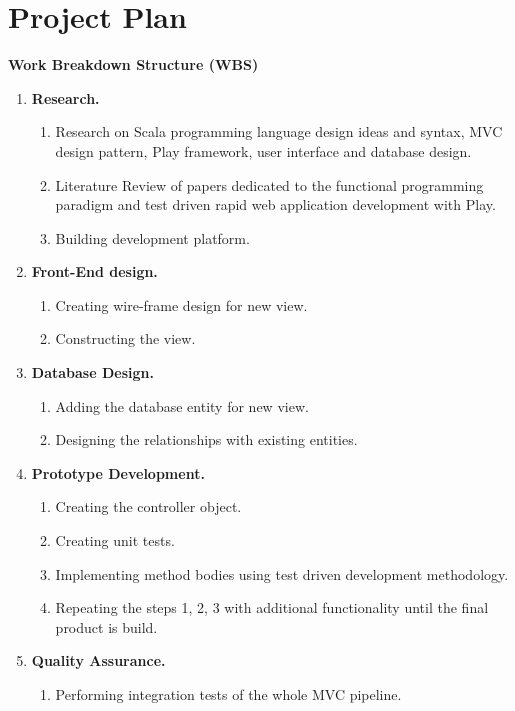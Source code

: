 \documentclass[12pt,twoside,a4paper]{report}
\begin{document}
\section{Project Plan}\label{1.7}
\textbf{Work Breakdown Structure (WBS)}
\begin{enumerate}
\item \textbf{Research.}
	\begin{enumerate}\itemsep1pt \parskip0pt 
	\item Research on Scala programming language design ideas and syntax, MVC design pattern, Play framework, user interface and database design.
	\item Literature Review of papers dedicated to the functional programming paradigm and test driven rapid web application development with Play.
	\item Building development platform.
	\end{enumerate}
\item \textbf{Front-End design.}
	\begin{enumerate}\itemsep1pt \parskip0pt 
	\item Creating wire-frame design for new view.
	\item Constructing the view.
	\end{enumerate}
\item \textbf{Database Design.}
	\begin{enumerate}\itemsep1pt \parskip0pt 
	\item Adding the database entity for new view.
	\item Designing the relationships with existing entities.
	\end{enumerate}
\item \textbf{Prototype Development.}
	\begin{enumerate}\itemsep1pt \parskip0pt 
	\item Creating the controller object.
	\item Creating unit tests.
	\item Implementing method bodies using test driven development methodology.
	\item Repeating the steps 1, 2, 3 with additional functionality until the final product is build.
	\end{enumerate}
\item \textbf{Quality Assurance.}
	\begin{enumerate}\itemsep1pt \parskip0pt 
	\item Performing integration tests of the whole MVC pipeline.

\end{enumerate}
\end{enumerate}
\end{document}
